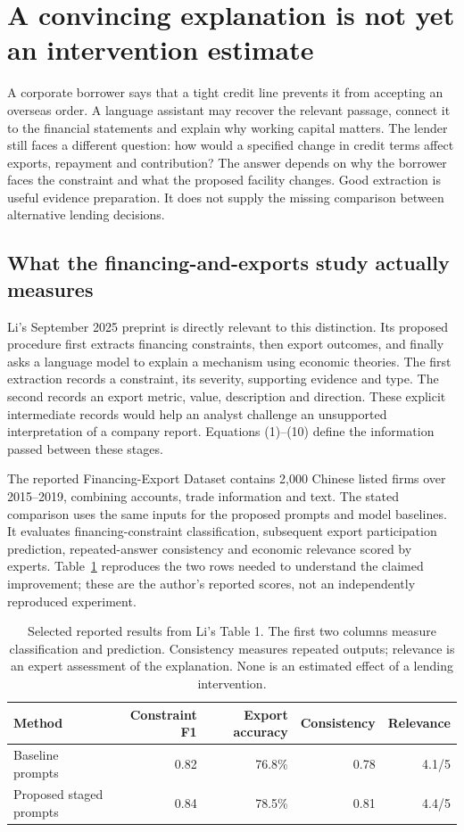 \section{A convincing explanation is not yet an intervention estimate}
\label{closure30:formulation}

A corporate borrower says that a tight credit line prevents it from accepting
an overseas order. A language assistant may recover the relevant passage,
connect it to the financial statements and explain why working capital matters.
The lender still faces a different question: how would a specified change in
credit terms affect exports, repayment and contribution? The answer depends on
why the borrower faces the constraint and what the proposed facility changes.
Good extraction is useful evidence preparation. It does not supply the missing
comparison between alternative lending decisions.

\subsection{What the financing-and-exports study actually measures}

Li's September 2025 preprint is directly relevant to this distinction. Its
proposed procedure first extracts financing constraints, then export outcomes,
and finally asks a language model to explain a mechanism using economic
theories. The first extraction records a constraint, its severity, supporting
evidence and type. The second records an export metric, value, description and
direction. These explicit intermediate records would help an analyst challenge
an unsupported interpretation of a company report. Equations (1)--(10) define
the information passed between these stages. \citep[Sections 3.1--3.4]{closure30li}

The reported Financing-Export Dataset contains 2,000 Chinese listed firms
over 2015--2019, combining accounts, trade information and text. The stated
comparison uses the same inputs for the proposed prompts and model baselines.
It evaluates financing-constraint classification, subsequent export
participation prediction, repeated-answer consistency and economic relevance
scored by experts. Table~\ref{closure30:exports} reproduces the two rows needed
to understand the claimed improvement; these are the author's reported
scores, not an independently reproduced experiment.

\begin{table}[htbp]
\centering\small
\begin{tabular}{lrrrr}
\toprule
Method & Constraint F1 & Export accuracy & Consistency & Relevance\\
\midrule
Baseline prompts & 0.82 & 76.8\% & 0.78 & 4.1/5\\
Proposed staged prompts & 0.84 & 78.5\% & 0.81 & 4.4/5\\
\bottomrule
\end{tabular}
\caption{Selected reported results from Li's Table 1. The first two columns
measure classification and prediction. Consistency measures repeated outputs;
relevance is an expert assessment of the explanation. None is an estimated
effect of a lending intervention.}
\label{closure30:exports}
\end{table}

